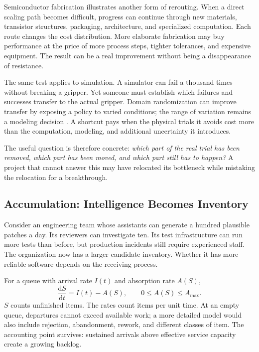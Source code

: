 Semiconductor fabrication illustrates another form of rerouting. When a direct scaling path becomes difficult, progress can continue through new materials, transistor structures, packaging, architecture, and specialized computation. Each route changes the cost distribution. More elaborate fabrication may buy performance at the price of more process steps, tighter tolerances, and expensive equipment. The result can be a real improvement without being a disappearance of resistance.

The same test applies to simulation. A simulator can fail a thousand times without breaking a gripper. Yet someone must establish which failures and successes transfer to the actual gripper. Domain randomization can improve transfer by exposing a policy to varied conditions; the range of variation remains a modeling decision \cite{tobin2017domain}. A shortcut pays when the physical trials it avoids cost more than the computation, modeling, and additional uncertainty it introduces.

The useful question is therefore concrete: \emph{which part of the real trial has been removed, which part has been moved, and which part still has to happen?} A project that cannot answer this may have relocated its bottleneck while mistaking the relocation for a breakthrough.

\subsection{Accumulation: Intelligence Becomes Inventory}

Consider an engineering team whose assistants can generate a hundred plausible patches a day. Its reviewers can investigate ten. Its test infrastructure can run more tests than before, but production incidents still require experienced staff. The organization now has a larger candidate inventory. Whether it has more reliable software depends on the receiving process.

For a queue with arrival rate $I(t)$ and absorption rate $A(S)$,
\begin{equation}
 \frac{\mathrm{d}S}{\mathrm{d}t}=I(t)-A(S),
 \qquad 0\leq A(S)\leq A_{\max}.
\end{equation}
$S$ counts unfinished items. The rates count items per unit time. At an empty queue, departures cannot exceed available work; a more detailed model would also include rejection, abandonment, rework, and different classes of item. The accounting point survives: sustained arrivals above effective service capacity create a growing backlog.


